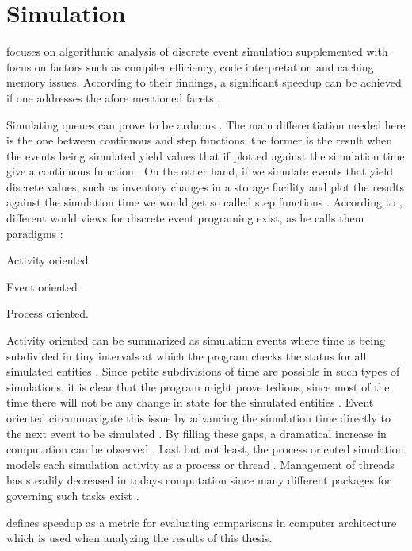 \section{Simulation}
\label{sec:simulation}

\citet{Bahouth2007} focuses on algorithmic analysis of discrete event simulation supplemented with focus on factors such as compiler efficiency, code interpretation and caching memory issues. According to their findings, a significant speedup can be achieved if one addresses the afore mentioned facets \citep{Bahouth2007}.

Simulating queues can prove to be arduous \citep{Matloff2008}. The main differentiation needed here is the one between continuous and step functions: the former is the result when the events being simulated yield values that if plotted against the simulation time give a continuous function \citep{Matloff2008}. On the other hand, if we simulate events that yield discrete values, such as inventory changes in a storage facility and plot the results against the simulation time we would get so called step functions \citep{Matloff2008}.
According to \citet{Matloff2008}, different world views for discrete event programing exist, as he calls them paradigms \citep{Matloff2008}:
\begin{enumerate*}
	\item Activity oriented
	\item Event oriented
	\item Process oriented.
\end{enumerate*}
Activity oriented can be summarized as simulation events where time is being subdivided in tiny intervals at which the program checks the status for all simulated entities \citep{Matloff2008}. Since petite subdivisions of time are possible in such types of simulations, it is clear that the program might prove tedious, since most of the time there will not be any change in state for the simulated entities \citep{Matloff2008}. Event oriented circumnavigate this issue by advancing the simulation time directly to the next event to be simulated \citep{Matloff2008}. By filling these gaps, a dramatical increase in computation can be observed \citep{Matloff2008}. Last but not least, the process oriented simulation models each simulation activity as a process or thread \citep{Matloff2008}. Management of threads has steadily decreased in todays computation since many different packages for governing such tasks exist \citep{Matloff2008}.

\citet{Milo2012} defines speedup as a metric for evaluating comparisons in computer architecture which is used when analyzing the results of this thesis.